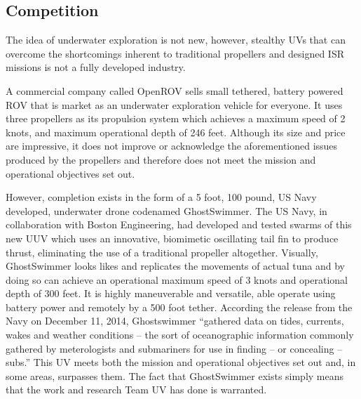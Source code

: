 \documentclass{report}
\begin{document}
\subsection{Competition}
The idea of underwater exploration is not new, however, stealthy UVs that can overcome the shortcomings inherent to traditional propellers and designed ISR missions is not a fully developed industry. \par
A commercial company called OpenROV sells small tethered, battery powered ROV that is market as an underwater exploration vehicle for everyone. It uses three propellers as its propulsion system which achieves a maximum speed of 2 knots, and maximum operational depth of 246 feet. Although its size and price are impressive, it does not improve or acknowledge the aforementioned issues produced by the propellers and therefore does not meet the mission and operational objectives set out.\par
However, completion exists in the form of a 5 foot, 100 pound, US Navy developed, underwater drone codenamed GhostSwimmer. The US Navy, in collaboration with Boston Engineering, had developed and tested swarms of this new UUV which uses an innovative, biomimetic oscillating tail fin to produce thrust, eliminating the use of a traditional propeller altogether. Visually, GhostSwimmer looks likes and replicates the movements of actual tuna and by doing so can achieve an operational maximum speed of 3 knots and operational depth of 300 feet. It is highly maneuverable and versatile, able operate using battery power and remotely by a 500 foot tether. According the release from the Navy on December 11, 2014, Ghostswimmer “gathered data on tides, currents, wakes and weather conditions -- the sort of oceanographic information commonly gathered by meterologists and submariners for use in finding -- or concealing -- subs.” This UV meets both the mission and operational objectives set out and, in some areas, surpasses them. The fact that GhostSwimmer exists simply means that the work and research Team UV has done is warranted. \par
\end{document}
